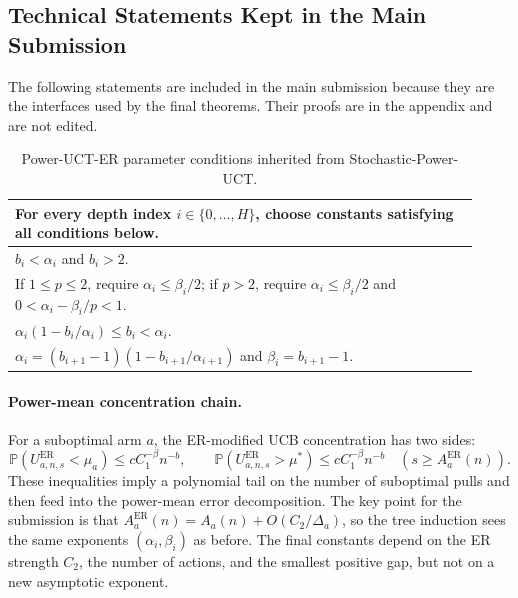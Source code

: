 \documentclass{article}
\newcommand{\Prob}{\mathbb{P}}
\begin{document}
\subsection{Technical Statements Kept in the Main Submission}
\label{sec:main_technical_statements}
The following statements are included in the main submission because they are the interfaces used by the final theorems.  Their proofs are in the appendix and are not edited.

\begin{table}[t]
\centering
\caption{Power-UCT-ER parameter conditions inherited from Stochastic-Power-UCT.}
\label{tab:main_conditions}
\small
\begin{tabular}{p{0.92\linewidth}}
\toprule
For every depth index $i\in\{0,\ldots,H\}$, choose constants satisfying all conditions below.\\
\midrule
$b_i<\alpha_i$ and $b_i>2$.\\
If $1\leq p\leq2$, require $\alpha_i\leq\beta_i/2$; if $p>2$, require $\alpha_i\leq\beta_i/2$ and $0<\alpha_i-\beta_i/p<1$.\\
$\alpha_i(1-b_i/\alpha_i)\leq b_i<\alpha_i$.\\
$\alpha_i=(b_{i+1}-1)(1-b_{i+1}/\alpha_{i+1})$ and $\beta_i=b_{i+1}-1$.\\
\bottomrule
\end{tabular}
\end{table}

\paragraph{Power-mean concentration chain.}
For a suboptimal arm $a$, the ER-modified UCB concentration has two sides:
\[
\Prob(U^{\mathrm{ER}}_{a,n,s}<\mu_a)\leq cC_1^{-\beta}n^{-b},
\qquad
\Prob(U^{\mathrm{ER}}_{a,n,s}>\mu^*)\leq cC_1^{-\beta}n^{-b}
\quad(s\geq A_a^{\mathrm{ER}}(n)).
\]
These inequalities imply a polynomial tail on the number of suboptimal pulls and then feed into the power-mean error decomposition.  The key point for the submission is that $A_a^{\mathrm{ER}}(n)=A_a(n)+O(C_2/\Delta_a)$, so the tree induction sees the same exponents $(\alpha_i,\beta_i)$ as before.  The final constants depend on the ER strength $C_2$, the number of actions, and the smallest positive gap, but not on a new asymptotic exponent.
\end{document}

